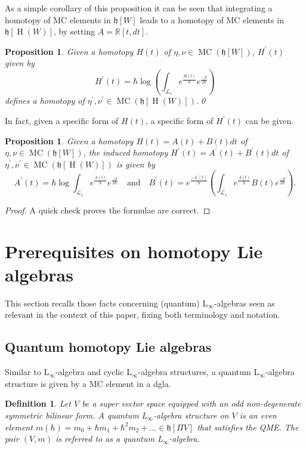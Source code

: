 \documentclass[]{amsart}
\newtheorem{proposition}[theorem]{Proposition}
\newtheorem{definition}[theorem]{Definition}
\theoremstyle{definition}
\newcommand{\Linf}{L$_\infty$}
\newcommand{\MC}{\operatorname{MC}}
\newcommand{\homology}{\operatorname{H}}
\begin{document}
As a simple corollary of this proposition it can be seen that integrating a homotopy of MC elements in $\mathfrak{h}[W]$ leads to a homotopy of MC elements in $\mathfrak{h}[\homology (W)]$, by setting $A=\mathbb{R}[t,dt]$.

\begin{proposition}\label{prop_int_homotopy}
Given a homotopy $H(t)$ of $\eta,\nu\in\MC(\mathfrak{h}[W])$, $H^\prime (t)$ given by
\[
H^\prime(t)= \hbar \log \left(\int_{\mathcal{L}_s} e^{\frac{H(t)}{\hbar}} e^{\frac{-\sigma}{2\hbar}}\right)
\]
defines a homotopy of $\eta^\prime,\nu^\prime\in\MC (\mathfrak{h}[\homology (W)])$.\qed
\end{proposition}

In fact, given a specific form of $H(t)$, a specific form of $H^\prime(t)$ can be given.

\begin{proposition}
Given a homotopy $H(t)=A(t)+B(t)dt$ of $\eta,\nu\in\MC(\mathfrak{h}[W])$, the induced homotopy $H^\prime (t)=A^\prime (t)+B^\prime (t)dt$ of $\eta^\prime,\nu^\prime\in\MC (\mathfrak{h}[\homology (W)])$ is given by
\[
A^\prime (t) = \hbar \log \int_{\mathcal{L}_s} e^{\frac{A(t)}{\hbar}} e^{\frac{-\sigma}{2\hbar}}\quad \text{and} \quad B^\prime (t)= e^\frac{-A^\prime (t)}{\hbar} \left(\int_{\mathcal{L}_s} e^\frac{A(t)}{\hbar} B(t) e^{\frac{-\sigma}{2\hbar}}\right).
\]
\end{proposition}
\begin{proof}
A quick check proves the formulae are correct.
\end{proof}


\section{Prerequisites on homotopy Lie algebras}\label{sec_linf}

This section recalls those facts concerning (quantum) \Linf-algebras seen as relevant in the context of this paper, fixing both terminology and notation.

\subsection{Quantum homotopy Lie algebras}

Similar to \Linf-algebra and cyclic \Linf-algebra structures, a quantum \Linf-algebra structure is given by a MC element in a dgla.

\begin{definition}\label{def_qLinf}
Let $V$ be a super vector space equipped with an odd non-degenerate symmetric bilinear form. A quantum \Linf-algebra structure on $V$ is an even element $m(\hbar)=m_0 + \hbar m_1 + \hbar^2 m_2  + \dots \in \mathfrak{h}[\Pi V]$ that satisfies the QME. The pair $(V,m)$ is referred to as a quantum \Linf-algebra.
\end{definition}
\end{document}
